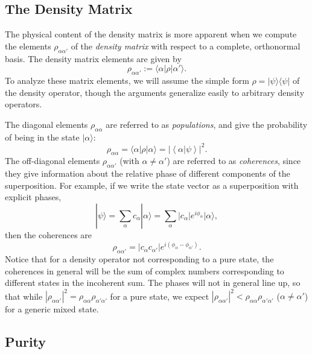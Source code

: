 \documentclass[aps,twocolumn,superscriptaddress,footinbib,floatfix,showpacs]{revtex4}
\def\ket#1{|{#1}\rangle}
\def\bra#1{\langle{#1}|}
\def\expct#1{\!\left\langle{#1}\right\rangle}
\begin{document}
\subsection{The Density Matrix}

The physical content of the density matrix is more apparent when 
we compute the elements $\rho_{\alpha\alpha'}$
of the \textit{density matrix} with respect to a complete, orthonormal basis.
The density matrix elements are given by
\begin{equation}
  \rho_{\alpha\alpha'} := \bra{\alpha}\rho\ket{\alpha'}.
\end{equation}
To analyze these matrix elements, we will assume the simple form
$\rho = \ket\psi\bra\psi$ of the density operator, though the
arguments generalize easily to arbitrary density operators.

The diagonal elements $\rho_{\alpha\alpha}$
are referred to as \textit{populations}, and give the probability
of being in the state $\ket\alpha$:
\begin{equation}
  \rho_{\alpha\alpha}=\bra{\alpha}\rho\ket{\alpha}
   = \left|\expct{\alpha|\psi}\right|^2.
\end{equation}
The off-diagonal elements $\rho_{\alpha\alpha'}$ (with $\alpha\neq\alpha'$)
are referred to as \textit{coherences}, since they give
information about the relative
phase of different components of the superposition.
For example, if we write the state vector as a superposition with
explicit phases,
\begin{equation}
  \ket\psi = \sum_\alpha c_\alpha \ket\alpha = \sum_\alpha |c_\alpha| e^{i\phi_\alpha}\ket\alpha,
\end{equation}
then the coherences are
\begin{equation}
  \rho_{\alpha\alpha'} = |c_\alpha c_{\alpha'}| e^{i(\phi_\alpha-\phi_{\alpha'})}.
\end{equation}
Notice that for a density operator not corresponding to a pure
state, the coherences in general will be the sum of complex numbers
corresponding to different states in the incoherent sum.
The phases will not in general line up, so that 
while $|\rho_{\alpha\alpha'}|^2 = \rho_{\alpha\alpha}\rho_{\alpha'\alpha'}$
for a pure state,
we expect $|\rho_{\alpha\alpha'}|^2 < \rho_{\alpha\alpha}\rho_{\alpha'\alpha'}$ 
($\alpha\neq\alpha'$) for a generic mixed
state.


\subsection{Purity}
\end{document}
